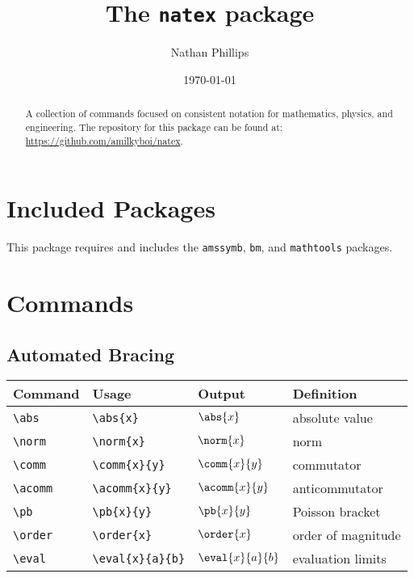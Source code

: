 \documentclass[11pt]{article}
\title{The \texttt{natex} package}
\author{Nathan Phillips}
\date{\today}
\begin{document}
\maketitle

\begin{abstract}
    A collection of commands focused on consistent notation for mathematics, physics, and engineering. The repository for this package can be found at: \url{https://github.com/amilkyboi/natex}.
\end{abstract}

\tableofcontents

\newpage
\section{Included Packages}

This package requires and includes the \verb|amssymb|, \verb|bm|, and \verb|mathtools| packages.

\newpage
\section{Commands}

\subsection{Automated Bracing}

\begin{tabular}{llll}
    Command       & Usage                 & Output           & Definition         \\
    \hline
    \verb|\abs|   & \verb|\abs{x}|        & $\abs{x}$        & absolute value     \\
    \verb|\norm|  & \verb|\norm{x}|       & $\norm{x}$       & norm               \\
    \verb|\comm|  & \verb|\comm{x}{y}|    & $\comm{x}{y}$    & commutator         \\
    \verb|\acomm| & \verb|\acomm{x}{y}|   & $\acomm{x}{y}$   & anticommutator     \\
    \verb|\pb|    & \verb|\pb{x}{y}|      & $\pb{x}{y}$      & Poisson bracket    \\
    \verb|\order| & \verb|\order{x}|      & $\order{x}$      & order of magnitude \\
    \verb|\eval|  & \verb|\eval{x}{a}{b}| & $\eval{x}{a}{b}$ & evaluation limits  \\
\end{tabular}
\end{document}
